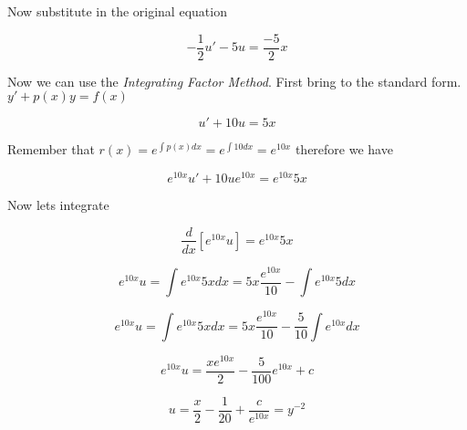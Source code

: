 Now substitute in the original equation

\[
- \frac{1}{2} u' - 5u = \frac{-5}{2}x
\]

Now we can use the \emph{Integrating Factor Method}. First bring to the standard form.
\(y' + p(x)y = f(x)\)

\[
  u' + 10u = 5x 
\]

Remember that \(r(x) = e^{\int p(x)dx} = e^{\int 10 dx} = e^{10x}\) therefore we have

\[
e^{10x}u' + 10ue^{10x} = e^{10x}5x
\]

Now lets integrate

\[
\frac{d}{dx} \left[e^{10x}u\right] = e^{10x}5x
\]

\[
e^{10x}u = \int e^{10x} 5x dx = 5x \frac{e^{10x}}{10} - \int e^{10x}5dx
\]

\[
e^{10x}u = \int e^{10x} 5x dx = 5x \frac{e^{10x}}{10} - \frac{5}{10}\int e^{10x}dx
\]

\[
e^{10x}u = \frac{xe^{10x}}{2} - \frac{5}{100} e^{10x} + c
\]

\[
u = \frac{x}{2} - \frac{1}{20} + \frac{c}{e^{10x}} = y^{-2}
\]




\newpage